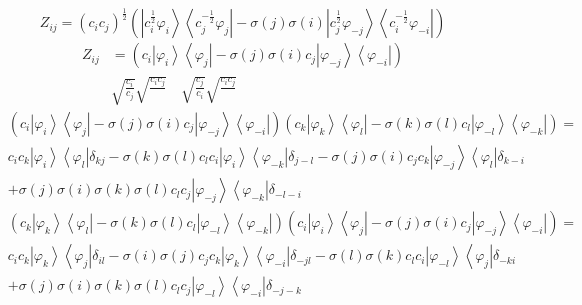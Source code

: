 \documentclass[aps,preprint]{revtex4}%
\begin{document}
\begin{equation}
Z_{ij}=\left(  c_{i}c_{j}\right)  ^{\frac{1}{2}}\left(  \left\vert
c_{i}^{\frac{1}{2}}\varphi_{i}\right\rangle \left\langle c_{j}^{-\frac{1}{2}%
}\varphi_{j}\right\vert -\sigma\left(  j\right)  \sigma\left(  i\right)
\left\vert c_{j}^{\frac{1}{2}}\varphi_{-j}\right\rangle \left\langle
c_{i}^{-\frac{1}{2}}\varphi_{-i}\right\vert \right)
\end{equation}%
\begin{align}
Z_{ij}  & =\left(  c_{i}\left\vert \varphi_{i}\right\rangle \left\langle
\varphi_{j}\right\vert -\sigma\left(  j\right)  \sigma\left(  i\right)
c_{j}\left\vert \varphi_{-j}\right\rangle \left\langle \varphi_{-i}\right\vert
\right)  \\
& \sqrt{\frac{c_{i}}{c_{j}}}\sqrt{\frac{c_{i}c_{j}}{{}}}\quad\sqrt{\frac
{c_{j}}{c_{i}}}\sqrt{\frac{c_{i}c_{j}}{{}}}%
\end{align}%
\begin{align}
&  \left(  c_{i}\left\vert \varphi_{i}\right\rangle \left\langle \varphi
_{j}\right\vert -\sigma\left(  j\right)  \sigma\left(  i\right)
c_{j}\left\vert \varphi_{-j}\right\rangle \left\langle \varphi_{-i}\right\vert
\right)  \left(  c_{k}\left\vert \varphi_{k}\right\rangle \left\langle
\varphi_{l}\right\vert -\sigma\left(  k\right)  \sigma\left(  l\right)
c_{l}\left\vert \varphi_{-l}\right\rangle \left\langle \varphi_{-k}\right\vert
\right)  =\\
&  c_{i}c_{k}\left\vert \varphi_{i}\right\rangle \left\langle \varphi
_{l}\right\vert \delta_{kj}-\sigma\left(  k\right)  \sigma\left(  l\right)
c_{l}c_{i}\left\vert \varphi_{i}\right\rangle \left\langle \varphi
_{-k}\right\vert \delta_{j-l}-\sigma\left(  j\right)  \sigma\left(  i\right)
c_{j}c_{k}\left\vert \varphi_{-j}\right\rangle \left\langle \varphi
_{l}\right\vert \delta_{k-i}\\
&  +\sigma\left(  j\right)  \sigma\left(  i\right)  \sigma\left(  k\right)
\sigma\left(  l\right)  c_{l}c_{j}\left\vert \varphi_{-j}\right\rangle
\left\langle \varphi_{-k}\right\vert \delta_{-l-i}%
\end{align}%
\begin{align}
&  \left(  c_{k}\left\vert \varphi_{k}\right\rangle \left\langle \varphi
_{l}\right\vert -\sigma\left(  k\right)  \sigma\left(  l\right)
c_{l}\left\vert \varphi_{-l}\right\rangle \left\langle \varphi_{-k}\right\vert
\right)  \left(  c_{i}\left\vert \varphi_{i}\right\rangle \left\langle
\varphi_{j}\right\vert -\sigma\left(  j\right)  \sigma\left(  i\right)
c_{j}\left\vert \varphi_{-j}\right\rangle \left\langle \varphi_{-i}\right\vert
\right)  =\\
&  c_{i}c_{k}\left\vert \varphi_{k}\right\rangle \left\langle \varphi
_{j}\right\vert \delta_{il}-\sigma\left(  i\right)  \sigma\left(  j\right)
c_{j}c_{k}\left\vert \varphi_{k}\right\rangle \left\langle \varphi
_{-i}\right\vert \delta_{-jl}-\sigma\left(  l\right)  \sigma\left(  k\right)
c_{l}c_{i}\left\vert \varphi_{-l}\right\rangle \left\langle \varphi
_{j}\right\vert \delta_{-ki}\\
&  +\sigma\left(  j\right)  \sigma\left(  i\right)  \sigma\left(  k\right)
\sigma\left(  l\right)  c_{l}c_{j}\left\vert \varphi_{-l}\right\rangle
\left\langle \varphi_{-i}\right\vert \delta_{-j-k}%
\end{align}%
\end{document}
